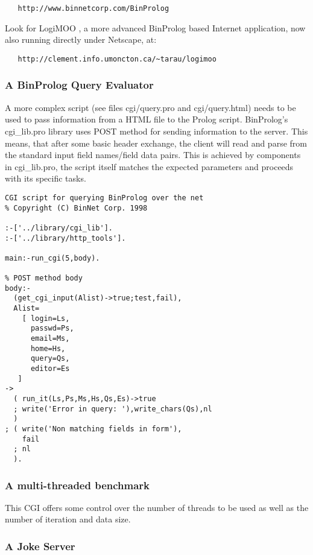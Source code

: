 \documentclass{article}
\begin{document}
{\small
\begin{verbatim}
   http://www.binnetcorp.com/BinProlog
\end{verbatim}
}

Look for LogiMOO \cite{lpnet96:virtual,DPT96:PAP}, a more advanced BinProlog based Internet application, now also running directly under Netscape, at:
{\small
\begin{verbatim}
   http://clement.info.umoncton.ca/~tarau/logimoo
\end{verbatim}
}

\subsubsection{A BinProlog Query Evaluator}
A more complex script (see files cgi/query.pro and cgi/query.html) needs to
be used to pass information from a HTML file to the Prolog script.
BinProlog's cgi\_lib.pro library uses POST method for sending information
to the server. This means, that after some basic header exchange, the client
will read and parse from the standard input field names/field data pairs.
This is achieved by components in cgi\_lib.pro, the script itself 
matches the expected parameters and proceeds with its specific tasks.

{\small \begin{verbatim}
CGI script for querying BinProlog over the net
% Copyright (C) BinNet Corp. 1998

:-['../library/cgi_lib'].
:-['../library/http_tools'].

main:-run_cgi(5,body).

% POST method body
body:-
  (get_cgi_input(Alist)->true;test,fail),
  Alist=
    [ login=Ls,
      passwd=Ps,
      email=Ms,
      home=Hs,
      query=Qs,
      editor=Es
   ]
->
  ( run_it(Ls,Ps,Ms,Hs,Qs,Es)->true
  ; write('Error in query: '),write_chars(Qs),nl
  )
; ( write('Non matching fields in form'),
    fail
  ; nl
  ).
\end{verbatim}}

\subsubsection{A multi-threaded benchmark}

This CGI offers some control over the number of threads to be used
as well as the number of iteration and data size. 

\subsubsection{A Joke Server}
\end{document}
